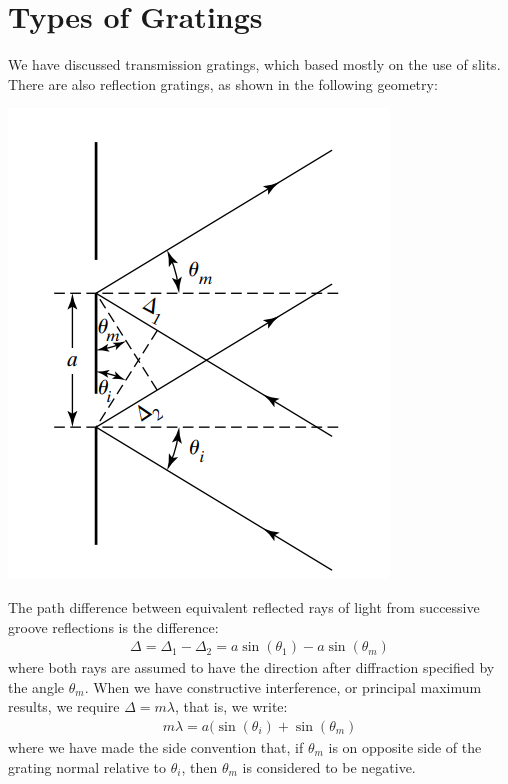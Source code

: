\documentclass[11pt]{book}
\theoremstyle{break}
\theoremstyle{break}
\begin{document}
\section[Types of Gratings]{\color{red}Types of Gratings\color{black}}
We have discussed transmission gratings, which based mostly on the use of slits. There are also reflection gratings, as shown in the following geometry:
\begin{center}
\includegraphics[scale=0.8]{ReflecGrat}
\end{center}
The path difference between equivalent reflected rays of light from successive groove reflections is the difference:
\begin{align*}
\Delta = \Delta_1 - \Delta_2 = a\sin(\theta_1) - a\sin(\theta_m)
\end{align*}
where both rays are assumed to have the direction after diffraction specified by the angle $\theta_m$. When we have constructive interference, or principal maximum results, we require $\Delta = m\lambda$, that is, we write:
\begin{align*}
m\lambda = a(\sin(\theta_i) + \sin(\theta_m)
\end{align*}
where we have made the side convention that, if $\theta_m$ is on opposite side of the grating normal relative to $\theta_i$, then $\theta_m$ is considered to be negative. 
\end{document}
